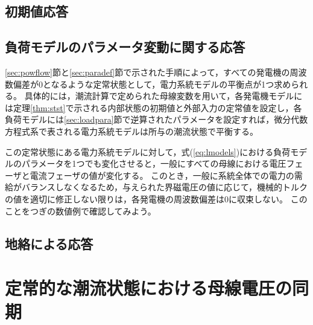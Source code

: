 \documentclass[tombow,dvipdfmx]{corona-a5-1.1}
\begin{document}
\subsection{初期値応答}

\begin{例}[電力系統モデルの初期値応答]
\end{例}


\subsection{負荷モデルのパラメータ変動に関する応答}\label{sec:resldpara}

\ref{sec:powflow}節と\ref{sec:paradef}節で示された手順によって，すべての発電機の周波数偏差が0となるような定常状態として，電力系統モデルの平衡点が1つ求められる。
具体的には，潮流計算で定められた母線変数を用いて，各発電機モデルには定理\ref{thm:stst}で示される内部状態の初期値と外部入力の定常値を設定し，各負荷モデルには\ref{sec:loadpara}節で逆算されたパラメータを設定すれば，微分代数方程式系で表される電力系統モデルは所与の潮流状態で平衡する。

この定常状態にある電力系統モデルに対して，式(\ref{eq:lmodels})における負荷モデルのパラメータを1つでも変化させると，一般にすべての母線における電圧フェーザと電流フェーザの値が変化する。
このとき，一般に系統全体での電力の需給がバランスしなくなるため，与えられた界磁電圧の値に応じて，機械的トルクの値を適切に修正しない限りは，各発電機の周波数偏差は0に収束しない。
このことをつぎの数値例で確認してみよう。

\begin{例}[負荷モデルのパラメータを変化させたときの電力系統モデルの時間応答]\label{ex:loadpv}
\end{例}


\subsection{地絡による応答}

\begin{例}[母線地絡が発生したときの電力系統モデルの時間応答]\label{ex:busflt}
\end{例}




\section{定常的な潮流状態における母線電圧の同期\advanced}\label{sec:phsync}
\end{document}
